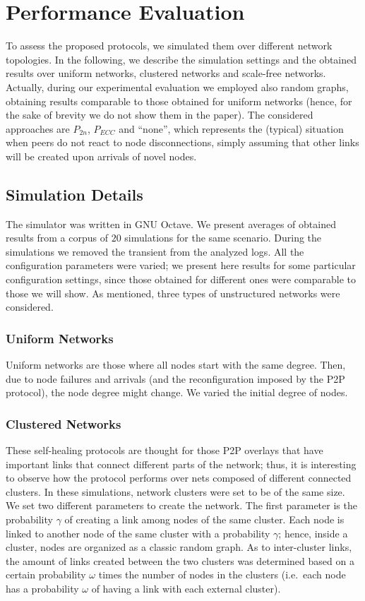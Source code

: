 \documentclass[10pt, conference, compsocconf]{IEEEtran}
\begin{document}
\section{Performance Evaluation}\label{sec:eval}

To assess the proposed protocols, we simulated them over different network topologies. In the following, we describe the simulation settings and the obtained results over uniform networks, clustered networks and scale-free networks. 
Actually, during our experimental evaluation we employed also random graphs, obtaining results comparable to those obtained for uniform networks (hence, for the sake of brevity we do not show them in the paper).
The considered approaches are $P_{2n}$, $P_{ECC}$ and ``none'', which represents the (typical) situation when peers do not react to node disconnections, simply assuming that other links will be created upon arrivals of novel nodes.

\subsection{Simulation Details}

The simulator was written in GNU Octave.
We present averages of obtained results from a corpus of $20$ simulations for the same scenario. During the simulations we removed the transient from the analyzed logs. All the configuration parameters were varied; we present here results for some particular configuration settings, since those obtained for different ones were comparable to those we will show.
As mentioned, three types of unstructured networks were considered. 

\subsubsection{Uniform Networks}
Uniform networks are those where all nodes start with the same degree. Then, due to node failures and arrivals (and the reconfiguration imposed by the P2P protocol), the node degree might change.
We varied the initial degree of nodes. 

\subsubsection{Clustered Networks}
These self-healing protocols are thought for those P2P overlays that have important links that connect different parts of the network; thus, it is interesting to observe how the protocol performs over nets composed of different connected clusters.
In these simulations, network clusters were set to be of the same size.
We set two different parameters to create the network. The first parameter is the probability $\gamma$ of creating a link among nodes of the same cluster. Each node is linked to another node of the same cluster with a probability $\gamma$; hence, inside a cluster, nodes are organized as a classic random graph.
As to inter-cluster links, the amount of links created between the two clusters was determined based on a certain probability $\omega$ times the number of nodes in the clusters (i.e.~each node has a probability $\omega$ of having a link with each external cluster).
\end{document}
